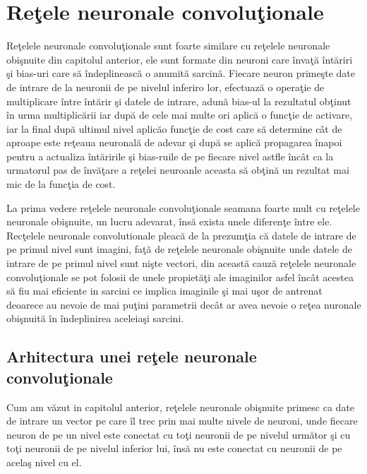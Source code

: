 \chapter{Re\c{t}ele neuronale convolu\c{t}ionale}

Re\c{t}elele neuronale convolu\c{t}ionale  sunt foarte similare cu re\c{t}elele neuronale obi\c{s}nuite din capitolul anterior, ele sunt formate din neuroni care \^{i}nva\c{t}\u{a} \^{i}nt\u{a}riri \c{s}i bias-uri care s\u{a} \^{i}ndeplineasc\u{a} o anumit\u{a} sarcin\u{a}. Fiecare neuron prime\c{s}te date de intrare de la neuronii de pe nivelul inferiro lor, efectuaz\u{a} o opera\c{t}ie de multiplicare \^{i}ntre \^{i}nt\u{a}rir \c{s}i datele de intrare, adun\u{a} bias-ul la rezultatul ob\c{t}inut \^{i}n urma multiplic\u{a}rii iar dup\u{a} de cele mai multe ori aplic\u{a} o func\c{t}ie de activare, iar la final dup\u{a} ultimul nivel aplic\u{a}o func\c{t}ie de cost care s\u{a} determine c\^{a}t de aproape este re\c{t}eaua neuronal\u{a} de adevar \c{s}i dup\u{a} se aplic\u{a} propagarea \^{i}napoi pentru a actualiza \^{i}nt\u{a}ririle \c{s}i bias-ruile de pe fiecare nivel astfle \^{i}nc\^{a}t ca la urmatorul pas de \^{i}nv\u{a}\c{t}are a re\c{t}elei neuroanle aceasta s\u{a} ob\c{t}in\u{a} un rezultat mai mic de la func\c{t}ia de cost.

La prima vedere re\c{t}elele neuronale convolu\c{t}ionale seamana foarte mult cu re\c{t}elele neuronale obi\c{s}nuite, un lucru adevarat, \^{i}ns\u{a} exista unele diferen\c{t}e \^{i}ntre ele. Rec\c{t}elele neuronale convolutionale pleac\u{a} de la prezum\c{t}ia c\u{a} datele de intrare de pe primul nivel sunt imagini, fa\c{t}\u{a} de re\c{t}elele neuronale obi\c{s}nuite unde datele de intrare de pe primul nivel sunt ni\c{s}te vectori, din aceast\u{a} cauz\u{a} re\c{t}elele neuronale convolu\c{t}ionale se pot folosii de unele propiet\u{a}\c{t}i ale imaginilor asfel \^{i}nc\^{a}t acestea s\u{a} fiu mai eficiente in sarcini ce implica imaginile \c{s}i mai u\c{s}or de antrenat deoarece au nevoie de mai pu\c{t}ini parametrii dec\^{a}t ar avea nevoie o re\c{t}ea nuronale obi\c{s}nuit\u{a} \^{i}n \^{i}ndeplinirea aceleia\c{s}i sarcini.

\section{Arhitectura unei re\c{t}ele neuronale convolu\c{t}ionale}

Cum am v\u{a}zut in capitolul anterior, re\c{t}elele neuronale obi\c{s}nuite primesc ca date de intrare un  vector pe care \^{i}l trec prin mai multe nivele de neuroni, unde fiecare neuron de pe un nivel este conectat cu to\c{t}i neuronii de pe nivelul urm\u{a}tor \c{s}i cu to\c{t}i neuronii de pe nivelul inferior lui, \^{i}ns\u{a} nu este conectat cu neuronii de pe acela\c{s} nivel cu el. 

